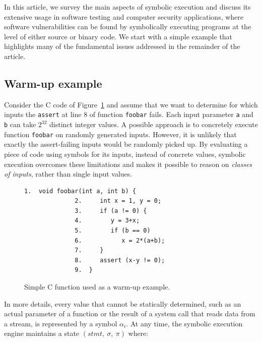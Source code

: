 
In this article, we survey the main aspects of symbolic execution and discuss its extensive usage in software testing and computer security applications, where software vulnerabilities can be found by symbolically executing programs at the level of either source or binary code. We start with a simple example that highlights many of the fundamental issues addressed in the remainder of the article.

\subsection{Warm-up example}
\label{symbolic-execution-example}

Consider the C code of Figure~\ref{fig:example-1} and assume that we want to determine for which inputs the  {\tt assert} at line 8 of function \texttt{foobar} fails. Each input parameter {\tt a} and {\tt b} can take $2^{32}$ distinct integer values. A possible approach is to concretely execute function \texttt{foobar} on randomly generated inputs.
However, it is unlikely that exactly the assert-failing inputs would be randomly picked up. 
By evaluating a piece of code using symbols for its inputs, instead of concrete values, symbolic execution overcomes these limitations and makes it possible to reason on {\em classes of inputs}, rather than single input values. 

\begin{figure}[t]
\begin{lstlisting}[basicstyle=\ttfamily\small]
              1.  void foobar(int a, int b) {
              2.     int x = 1, y = 0;
              3.     if (a != 0) {
              4.        y = 3+x;
              5.        if (b == 0)
              6.           x = 2*(a+b);
              7.     }
              8.     assert (x-y != 0);
              9.  }
\end{lstlisting}
\caption{Simple C function used as a warm-up example.}
\label{fig:example-1}
\end{figure}

In more details, every value that cannot be statically determined, such as an actual parameter of a function or the result of a system call that reads data from a stream, is represented by a symbol $\alpha_i$. At any time, the symbolic execution engine maintains a state $(stmt,~\sigma,~\pi)$ where:

